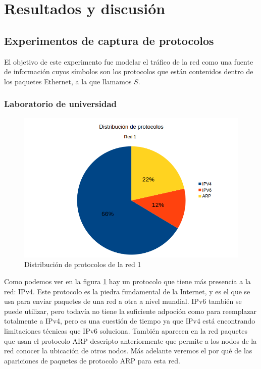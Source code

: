 \section{Resultados y discusión}

\subsection{Experimentos de captura de protocolos}

El objetivo de este experimento fue modelar el tráfico de la red como una fuente de información cuyos símbolos son los protocolos que están contenidos dentro de los paquetes Ethernet, a la que llamamos $S$.

\subsubsection{Laboratorio de universidad}

\begin{figure}[H]
	\centering
	\includegraphics[scale=0.65]{imgs/red1_capturar.png}
	\caption{Distribución de protocolos de la red 1}
      \label{red1_capturar}
\end{figure}

Como podemos ver en la figura \ref{red1_capturar} hay un protocolo que tiene más presencia a la red: IPv4. Este protocolo es la piedra fundamental de la Internet, y es el que se usa para enviar paquetes de una red a otra a nivel mundial. IPv6 también se puede utilizar, pero todavía no tiene la suficiente adpoción como para reemplazar totalmente a IPv4, pero es una cuestión de tiempo ya que IPv4 está encontrando limitaciones técnicas que IPv6 soluciona. También aparecen en la red paquetes que usan el protocolo ARP descripto anteriormente que permite a los nodos de la red conocer la ubicación de otros nodos. Más adelante veremos el por qué de las apariciones de paquetes de protocolo ARP para esta red.

